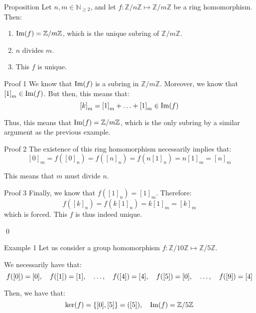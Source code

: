 \documentclass[a4paper]{article}
\begin{document}
\begin{parag}{Proposition}
    Let $n, m \in \mathbb{N}_{\geq 2}$, and let $f: \mathbb{Z}/n\mathbb{Z} \mapsto \mathbb{Z}/m\mathbb{Z}$ be a ring homomorphism. Then:
    \begin{enumerate}
        \item $\im\left(f\right) = \mathbb{Z}/m\mathbb{Z}$, which is the unique subring of $\mathbb{Z}/m\mathbb{Z}$.
        \item $n$ divides $m$.
        \item This $f$ is unique.
    \end{enumerate}

    \begin{subparag}{Proof 1}
        We know that $\im\left(f\right)$ is a subring in $\mathbb{Z}/m\mathbb{Z}$. Moreover, we know that $\left[1\right]_m \in \im\left(f\right)$. But then, this means that: 
        \[\left[k\right]_m = \left[1\right]_m + \ldots + \left[1\right]_m \in \im\left(f\right)\]
        
        Thus, this means that $\im\left(f\right) = \mathbb{Z}/m\mathbb{Z}$, which is the only subring by a similar argument as the previous example.
    \end{subparag}
    
    \begin{subparag}{Proof 2}
        The existence of this ring homomorphism necessarily implies that: 
        \[\left[0\right]_m = f\left(\left[0\right]_n\right) = f\left(\left[n\right]_n\right) = f\left(n \left[1\right]_n\right) = n\left[1\right]_m = \left[n\right]_m \]
        
        This means that $m$ must divide $n$.
    \end{subparag}

    \begin{subparag}{Proof 3}
        Finally, we know that $f\left(\left[1\right]_n\right) = \left[1\right]_m$. Therefore:
        \[f\left(\left[k\right]_n\right) = f\left(k\left[1\right]_n\right) = k\left[1\right]_m = \left[k\right]_m\]
        which is forced. This $f$ is thus indeed unique.

        \qed
    \end{subparag}
\end{parag}

\begin{parag}{Example 1}
    Let us consider a group homomorphism $f: \mathbb{Z}/10\mathbb{Z} \mapsto \mathbb{Z}/5\mathbb{Z}$.

    We necessarily have that: 
    \[f\left(\left[0\right]\right) = \left[0\right], \mathspace f\left(\left[1\right]\right) = \left[1\right], \mathspace \ldots, \mathspace f\left(\left[4\right]\right) = \left[4\right], \mathspace f\left(\left[5\right]\right) = \left[0\right], \mathspace \ldots, \mathspace f\left(\left[9\right]\right) = \left[4\right]\]
    
    Then, we have that: 
    \[\ker\left(f\right) = \left\{\left[0\right], \left[5\right]\right\} = \left(\left[5\right]\right), \mathspace \im\left(f\right) = \mathbb{Z}/5\mathbb{Z}\]
\end{parag}
\end{document}
